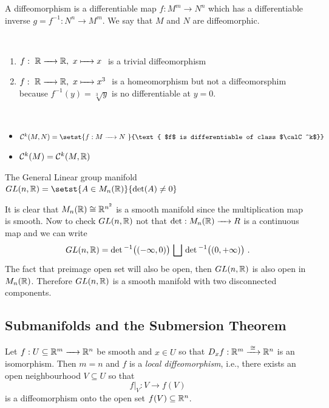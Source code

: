 \begin{definition}
	A diffeomorphism is a differentiable map $f:M^m \to N^n$ which has a differentiable inverse $g=f^{-1}: N^n \to M^m$. We say that $M$ and $N$ are diffeomorphic.
\end{definition}

\begin{example}
	~
	\begin{enumerate}[(1)]
		\item $f:~\bbR \to \bbR, ~x \mapsto x~$ is a trivial diffeomorphism
		\item $f:~\bbR \to \bbR, ~x \mapsto x^3~$ is a homeomorphism but not a diffeomorsphim because $f^{-1}(y)=\sqrt[3]{y}$ is no differentiable at $y=0$.
	\end{enumerate}
\end{example}

\begin{notation}
	~
	\begin{itemize}
		\item $\calC^k(M,N) = \setst{f:M\to N~}{\text{ $f$ is differentiable of class $\calC^k$}}$
		\item $\mathcal{C}^k(M) = \mathcal{C}^k(M,\mathbb R)$
	\end{itemize}
\end{notation}

\begin{example}
	The General Linear group manifold $GL(n,\bbR)=\setst{ A \in M_n(\bbR)}{\det(A)\ne 0}$
	
	It is clear that $M_n(\mathbb R) \cong \mathbb R^{n^2}$ is a smooth manifold since the multiplication map is smooth.
	Now to check $GL(n,\mathbb R)$ not that $\det: M_n(\bbR) \to R$ is a continuous map and we can write
	$$GL(n,\mathbb R) = \det{}^{-1}\bigr((-\infty,0)\bigr) \,\bigsqcup\, \det{}^{-1}\bigr((0,+\infty)\bigr) ~.$$
	The fact that preimage open set will also be open, then $GL(n,\mathbb R)$ is also open in $M_n(\mathbb R)$. Therefore $GL(n,\mathbb R)$ is a smooth manifold with two disconnected components.
\end{example}

\clearpage

\subsection{Submanifolds and the Submersion Theorem}

\begin{theorem} \label{thm:IFT}
	Let $f:U\subseteq \bbR^m \to \bbR^n$ be smooth and $x\in U$ so that $D_x f : \mathbb R^m \xrightarrow{\;\cong\;} \mathbb R^n$ is an isomorphism. Then $m=n$ and $f$ is a \emph{local diffeomorphism}, i.e., there exists an open neighbourhood  $V \subseteq U$ so that
	$$ f\rvert_{V} : V \to f(V)$$
	is a diffeomorphism onto the open set $f(V)\subseteq \mathbb R^n$.
\end{theorem}


